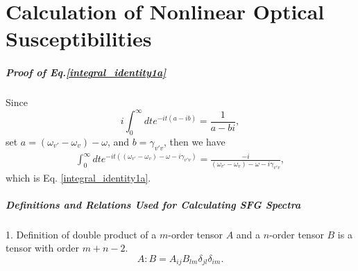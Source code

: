 \chapter{Calculation of Nonlinear Optical Susceptibilities}\label{calculation_of_chi}

%
\paragraph{Proof of Eq.\space\ref{integral_identity1a}}
Since 
\begin{equation}
  i\int_0^\infty dt e^{-it(a-ib)}=\frac{1}{a-bi},
  \label{integral_identity1}
\end{equation}
set $a = (\omega_{v'} - \omega_{v}) - \omega$, and $b = \gamma_{v'v}$,
then we have
 \begin{align}
 \int_0^\infty dt e^{-it((\omega_{v'}-\omega_v)-\omega-i\gamma_{v'v})}=\frac{-i}{(\omega_{v'} -\omega_v)-\omega-i\gamma_{v'v}},\nonumber
 \end{align}
which is Eq. \ref{integral_identity1a}.

\paragraph{Definitions and Relations Used for Calculating SFG Spectra}
1. Definition of double product of a $m$-order tensor $A$ and a $n$-order tensor $B$ is a tensor with order $m+n-2$.
\begin{equation}
    A:B=A_{ij}B_{lm}\delta_{jl}\delta_{im}.
\label{tensor_double_product}
\end{equation}

